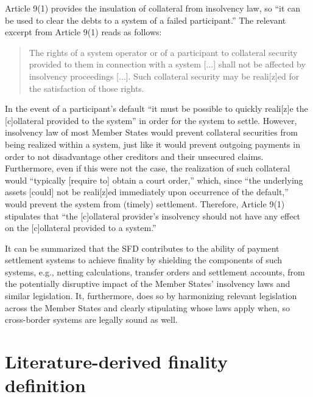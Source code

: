 Article 9(1) provides the insulation of collateral from insolvency law, so ``it can be used to clear the debts to a system of a failed participant.'' \autocite[19]{cpmi2001}
The relevant excerpt from Article 9(1) reads as follows: \autocite{eu1998sfd}

\begin{quote}
	The rights of a system operator or of a participant to collateral security provided to them in connection with a system [...] shall not be affected by insolvency proceedings [...].
	Such collateral security may be reali[z]ed for the satisfaction of those rights.
\end{quote}

In the event of a participant's default ``it must be possible to quickly reali[z]e the [c]ollateral provided to the system'' in order for the system to settle. \autocite[60]{vereecken2003}
However, insolvency law of most Member States would prevent collateral securities from being realized within a system, just like it would prevent outgoing payments in order to not disadvantage other creditors and their unsecured claims.
Furthermore, even if this were not the case, the realization of such collateral would ``typically [require to] obtain a court order,'' which, since ``the underlying assets [could] not be reali[z]ed immediately upon occurrence of the default,'' would prevent the system from (timely) settlement. \autocite[60, 61]{vereecken2003}
Therefore, Article 9(1) stipulates that ``the [c]ollateral provider's insolvency should not have any effect on the [c]ollateral provided to a system.'' \autocite[61]{vereecken2003}

It can be summarized that the SFD contributes to the ability of payment settlement systems to achieve finality by shielding the components of such systems, e.g., netting calculations, transfer orders and settlement accounts, from the potentially disruptive impact of the Member States' insolvency laws and similar legislation.
It, furthermore, does so by harmonizing relevant legislation across the Member States and clearly stipulating whose laws apply when, so cross-border systems are legally sound as well.

\section{Literature-derived finality definition}

